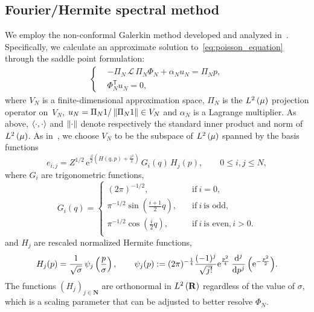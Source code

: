 \documentclass[11pt,a4paper]{article}
\newcommand{\e}{\mathrm{e}}
\newcommand{\nat}{\mathbf N}
\newcommand{\real}{\mathbf R}
\renewcommand{\t}{\mathsf T}
\theoremstyle{plain}
\numberwithin{equation}{section}
\renewcommand{\leq}{\leqslant}
\begin{document}
\subsection{Fourier/Hermite spectral method}%
\label{sub:galerkin_approach}
We employ the non-conformal Galerkin method developed and analyzed in~\cite{roussel2018spectral}.
Specifically, we calculate an approximate solution to~\eqref{eq:poisson_equation} through the saddle point formulation:
\begin{align}
  \label{eq:saddle_point_formutation}
  \left\{
    \begin{aligned}
       & - \Pi_N \, \mathcal L \, \Pi_N \Phi_N + \alpha_N u_N = \Pi_N p, \\
       & \Phi_N^\t u_N = 0,
    \end{aligned}
  \right.
\end{align}
where $V_N$ is a finite-dimensional approximation space,
$\Pi_N$ is the $\lp{2}{\mu}$ projection operator on~$V_N$,
$u_N = \Pi_N 1 / \norm{\Pi_N 1} \in V_N$
and $\alpha_N$ is a Lagrange multiplier.
As above,
$\ip{\cdot}{\cdot}$ and $\norm{\cdot}$ denote respectively the standard inner product and norm of $\lp{2}{\mu}$.
As in~\cite{roussel2018spectral},
we choose $V_N$ to be the subspace of $\lp{2}{\mu}$ spanned by the basis functions
\begin{equation*}
  \label{eq:basis_functions}
  e_{i,j} = Z^{1/2} \, \e^{\frac{\beta}{2} \left( H(q,p) + \frac{z^2}{2} \right)}
  \, G_i(q) \, H_j(p), \qquad 0 \leq i,j \leq N,
\end{equation*}
where $G_i$ are trigonometric functions,
\begin{equation}
  \label{eq:definition_trigonometric_functions}
  G_i(q) =
  \left\{ \begin{aligned}
    (2 \pi)^{-1/2}, \quad & \text{if}~i = 0, \\
    \pi^{-1/2} \sin\left(\frac{i + 1}{2}q\right), \quad & \text{if}~i~\text{is odd}, \\
    \pi^{-1/2} \cos\left(\frac{i}{2}q\right), \quad & \text{if}~i~\text{is even}, i > 0. \\
  \end{aligned} \right.
\end{equation}
and $H_j$ are rescaled normalized Hermite functions,
\begin{equation}
  \label{eq:definition_hermite_functions}
  H_j(p) = \frac{1}{\sqrt{\sigma}} \, \psi_j \left( \frac{p}{\sigma} \right),
  \qquad \psi_j (p) := (2 \pi)^{-\frac{1}{4}} \frac{(-1)^j}{\sqrt{j!}} \e^{\frac{p^2}{4}} \, \derivative*{j}{p^j} \, \Bigl( \e^{- \frac{p^2}{2}} \Bigr).
\end{equation}
The functions $(H_j)_{j\in \nat}$ are orthonormal in $\lp{2}{\real}$ regardless of the value of $\sigma$,
which is a scaling parameter that can be adjusted to better resolve $\Phi_N$.
\end{document}
